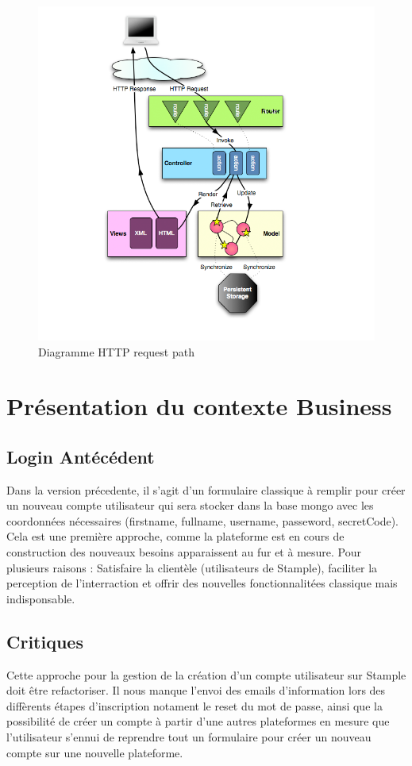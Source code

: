 \documentclass[12pt,oneside,a4paper]{article}
\begin{document}
\begin{figure}[H]
        \centering
                \centering
                \includegraphics[width=\textwidth]{diagrams_path.png}
                \caption{Diagramme HTTP request path}
                \label{fig:Diagramme HTTP request path}
       
\end{figure}
\newpage
\section{Présentation du contexte Business}
\subsection{Login Antécédent}
Dans la version précedente, il s'agit d'un formulaire classique à remplir pour créer un nouveau compte utilisateur qui sera stocker dans la base mongo avec les coordonnées nécessaires (firstname, fullname, username, passeword, secretCode).
Cela est une première approche, comme la plateforme est en cours de construction des nouveaux besoins apparaissent au fur et à mesure.
Pour plusieurs raisons : Satisfaire la clientèle (utilisateurs de Stample), faciliter la perception de l'interraction et offrir des nouvelles fonctionnalitées classique mais indisponsable.  
\subsection{Critiques}
Cette approche pour la gestion de la création d'un compte utilisateur sur Stample doit être refactoriser.
Il nous manque l'envoi des emails d'information lors des diffèrents étapes d'inscription notament le reset du mot de passe, ainsi que la possibilité de créer un compte à partir d'une autres plateformes en mesure que l'utilisateur s'ennui de reprendre tout un formulaire pour créer un nouveau compte sur une nouvelle plateforme.
\end{document}
